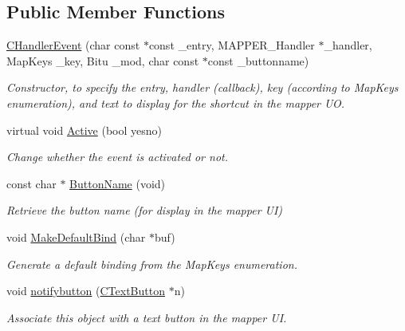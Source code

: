 \subsection*{Public Member Functions}
\begin{DoxyCompactItemize}
\item 
\hypertarget{classCHandlerEvent_aca304371826b35def368cb051ca7a625}{\hyperlink{classCHandlerEvent_aca304371826b35def368cb051ca7a625}{C\-Handler\-Event} (char const $\ast$const \-\_\-entry, M\-A\-P\-P\-E\-R\-\_\-\-Handler $\ast$\-\_\-handler, Map\-Keys \-\_\-key, Bitu \-\_\-mod, char const $\ast$const \-\_\-buttonname)}\label{classCHandlerEvent_aca304371826b35def368cb051ca7a625}

\begin{DoxyCompactList}\small\item\em Constructor, to specify the entry, handler (callback), key (according to Map\-Keys enumeration), and text to display for the shortcut in the mapper U\-O. \end{DoxyCompactList}\item 
\hypertarget{classCHandlerEvent_af4a0835bf174abb23ae9b88c0521e9c8}{virtual void \hyperlink{classCHandlerEvent_af4a0835bf174abb23ae9b88c0521e9c8}{Active} (bool yesno)}\label{classCHandlerEvent_af4a0835bf174abb23ae9b88c0521e9c8}

\begin{DoxyCompactList}\small\item\em Change whether the event is activated or not. \end{DoxyCompactList}\item 
\hypertarget{classCHandlerEvent_a58aafd6e482cff4b63507391d424477f}{const char $\ast$ \hyperlink{classCHandlerEvent_a58aafd6e482cff4b63507391d424477f}{Button\-Name} (void)}\label{classCHandlerEvent_a58aafd6e482cff4b63507391d424477f}

\begin{DoxyCompactList}\small\item\em Retrieve the button name (for display in the mapper U\-I) \end{DoxyCompactList}\item 
\hypertarget{classCHandlerEvent_a3062e41266603ad8918a7ca2bba8f095}{void \hyperlink{classCHandlerEvent_a3062e41266603ad8918a7ca2bba8f095}{Make\-Default\-Bind} (char $\ast$buf)}\label{classCHandlerEvent_a3062e41266603ad8918a7ca2bba8f095}

\begin{DoxyCompactList}\small\item\em Generate a default binding from the Map\-Keys enumeration. \end{DoxyCompactList}\item 
\hypertarget{classCHandlerEvent_a3bd14f3961c29799530602c8e2d5a6fe}{void \hyperlink{classCHandlerEvent_a3bd14f3961c29799530602c8e2d5a6fe}{notifybutton} (\hyperlink{classCTextButton}{C\-Text\-Button} $\ast$n)}\label{classCHandlerEvent_a3bd14f3961c29799530602c8e2d5a6fe}

\begin{DoxyCompactList}\small\item\em Associate this object with a text button in the mapper U\-I. \end{DoxyCompactList}\end{DoxyCompactItemize}
